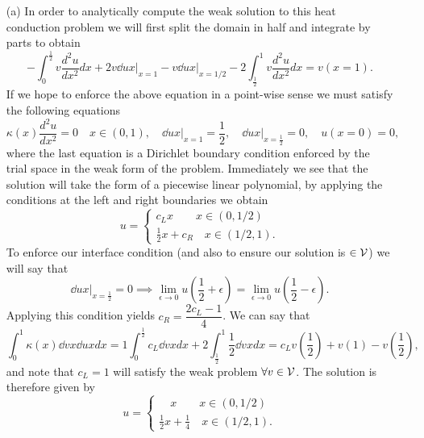 \documentclass{article}
\begin{document}
\begin{itemize}
	\item[(a)] In order to analytically compute the weak solution to this heat conduction problem we will first split the domain in half and integrate by parts to obtain
	\begin{equation*}
		-\int_0^\frac{1}{2}v\dfrac{d^2u}{dx^2}dx + \left.2v\dd{u}{x}\right|_{x=1} - \left.v\dd{u}{x}\right|_{x=1/2} - 2\int_\frac{1}{2}^1v\dfrac{d^2u}{dx^2}dx = v(x=1).
	\end{equation*}
	If we hope to enforce the above equation in a point-wise sense we must satisfy the following equations
	\begin{equation*}
		\kappa(x)\dfrac{d^2u}{dx^2} = 0 \quad x \in (0,1),\quad \left.\dd{u}{x}\right|_{x=1} = \dfrac{1}{2},\quad \left.\dd{u}{x}\right|_{x=\frac{1}{2}} = 0,\quad u(x=0)=0,
	\end{equation*}
	where the last equation is a Dirichlet boundary condition enforced by the trial space in the weak form of the problem. Immediately we see that the solution will take the form of a piecewise linear polynomial, by applying the conditions at the left and right boundaries we obtain
	\begin{equation*}
		u = \begin{cases} c_Lx \quad\quad x\in(0,1/2)\\ \frac{1}{2}x + c_R\quad x\in(1/2,1).
		\end{cases}
	\end{equation*}
	To enforce our interface condition (and also to ensure our solution is \(\in \mathcal{V}\)) we will say that 
	\begin{equation*}
		\left.\dd{u}{x}\right|_{x=\frac{1}{2}} = 0 \implies \lim\limits_{\epsilon\to0}u(\frac{1}{2} + \epsilon) = \lim\limits_{\epsilon\to0} u(\frac{1}{2} - \epsilon).
	\end{equation*}
	Applying this condition yields \(c_R = \dfrac{2c_L-1}{4} \). We can say that 
	\begin{equation*}
		\int_0^1\kappa(x)\dd{v}{x}\dd{u}{x}dx = 1\int_0^\frac{1}{2}c_L\dd{v}{x}dx + 2\int_\frac{1}{2}^1\frac{1}{2}\dd{v}{x}dx = c_Lv(\frac{1}{2}) + v(1) - v(\frac{1}{2}),
	\end{equation*}
	and note that \(c_L = 1 \) will satisfy the weak problem \(\forall v \in \mathcal{V} \). The solution is therefore given by
	\begin{equation*}
		u = \begin{cases} \quad x \quad\quad x\in(0,1/2)\\ \frac{1}{2}x + \frac{1}{4}\quad x\in(1/2,1).

\end{cases}
\end{equation*}
\end{itemize}
\end{document}
